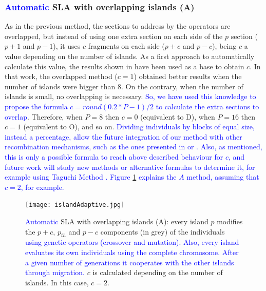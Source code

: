 \documentclass[preprint]{elsarticle}
\begin{document}
\subsubsection{\textcolor{blue}{Automatic} SLA with overlapping islands (A)} 
As in the previous method, the sections to address by the operators are overlapped, but
instead of using one extra section on each side of the $p$ section ($p+1$
and $p-1$), it uses $c$ fragments on each side ($p+c$ and $p-c$),
being $c$ a value depending on the number of islands.
As a first
approach to automatically calculate this value, the results shown in
\citep{Garcia16hpmoon} have been used as a base to obtain $c$. In that
work, the overlapped method ($c=1$) obtained better results when the
number of islands were bigger than 8. On the contrary, when the number of
islands is small, no overlapping is necessary. \textcolor{blue}{So, we have used this
knowledge to propose the formula $c=round(0.2*P-1)/2$ to calculate the
extra sections to overlap}. Therefore, when $P=8$ then $c=0$
(equivalent to D), when $P=16$ then $c=1$ (equivalent to O), and so
on. \textcolor{blue}{Dividing individuals by blocks of equal size, instead a percentage, allow the future integration of our method with other recombination mechanisms, such as the ones presented in \cite{Dorronsoro13superlinear} or \cite{Kimovski15Parallel}.
Also, as mentioned, this is only a possible formula to reach above described behaviour for $c$, and future work will study new methods or alternative formulas to determine it, for example using Taguchi Method \cite{Keratmatpour2018Taguchi}.  Figure \ref{fig:adaptive} explains the $A$ method, assuming that $c=2$, for example. }

\begin{figure}[h!tb]
\centering
\texttt{[image: islandAdaptive.jpg]}
\caption{\textcolor{blue}{Automatic} SLA with overlapping islands (A): every island $p$ modifies the  $p+c$,
  $p_{th}$ and $p-c$  components (in grey) of the individuals \textcolor{blue}{using genetic operators (crossover and mutation). Also, every island evaluates its own individuals using the complete chromosome. After a given number of generations it cooperates with the other islands through migration.} $c$ is calculated depending on the number of islands. In this case, $c=2$.}
  \label{fig:adaptive}
\end{figure}
\end{document}
